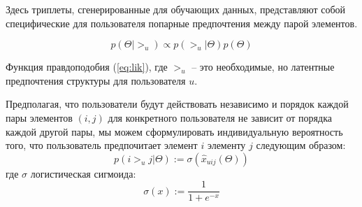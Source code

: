           \begin{figure}[ht]
            \begin{center}
            
            \caption{
            \label{BPR2}
                 }
            \end {center}
            \end {figure}

            Здесь триплеты, сгенерированные для обучающих данных, представляют собой специфические для пользователя попарные предпочтения между парой элементов.
            

      \begin{equation}
        p(\Theta| >_u) \propto p(>_u| \Theta)p(\Theta)
        \label{eq:lik}
      \end{equation}

      Функция правдоподобия (\ref{eq:lik}), где ${>_u}$ -- это необходимые, 
      но латентные предпочтения структуры для пользователя $u$.

      Предполагая, что пользователи будут действовать независимо и порядок 
      каждой пары элементов ${(i, j)}$ для конкретного пользователя не зависит 
      от порядка каждой другой пары, мы можем сформулировать индивидуальную 
      вероятность того, что пользователь предпочитает элемент $i$ элементу $j$ 
      следующим образом:
      \begin{equation}
        p(i >_u j|\Theta) := \sigma(\hat x_{uij}(\Theta))
        \label{eq:ver}
      \end{equation}
    где $\sigma$ логистическая сигмоида: 
    \begin{equation}
        \sigma(x) := \frac{1}{1+e^{-x}}
        \label{eq:sigm}
      \end{equation}

